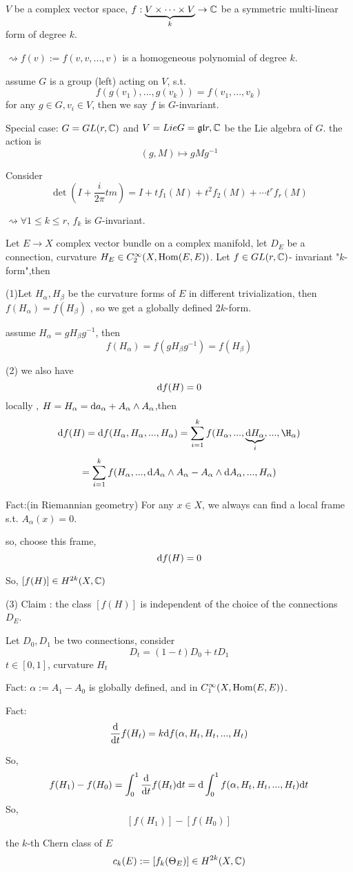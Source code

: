 $V$ be a complex vector space, $f:\underbrace{V\times\cdots\times V}_k\to \mathbb{C}$
be a symmetric multi-linear form of degree $k$. 

$\rightsquigarrow f(v):=f(v,v,...,v)$ is a homogeneous polynomial of degree $k$.
\begin{definition}
assume $G$ is a group (left) acting on $V$, s.t. 
$$f(g(v_1),...,g(v_k))=f(v_1,...,v_k)$$
for any $g\in G,v_i\in V$, then we say $f$ is $G$-invariant. 
\end{definition} 

Special case: $G=GL(r,\mathbb{C})$ and $V=Lie G=\mathfrak{gl}{r,\mathbb{C}}$ be the Lie algebra of $G$.
the action is 
$$(g,M)\mapsto gMg^{-1}$$

Consider 
$$\det(I+\frac{i}{2\pi}tm)=I+tf_1(M)+t^2f_2(M)+\cdots t^rf_r(M)$$

$\rightsquigarrow\forall 1\leq k\leq r$, $f_k$ is $G$-invariant.

Let $E\to X$ complex vector bundle on a complex manifold, 
let $D_E$ be a connection, 
curvature $H_E\in C_2^\infty(X,\operatorname{Hom}(E,E))$.
 Let $f\in GL(r,\mathbb{C})$- invariant "$k$-form",then

(1)Let $H_{\alpha},H_{\beta}$ be the curvature forms of $E$ in different trivialization, 
then $f(H_\alpha)=f(H_{\beta})$ , so we get a globally defined $2k$-form.

assume $H_\alpha=gH_\beta g^{-1}$, then 
$$f(H_\alpha)=f(g H_\beta g^{-1})=f(H_\beta)$$

(2) we also have 
$$\mathrm{d} f(H)=0$$
locally , $H=H_\alpha=\mathrm{d} a_\alpha+A_\alpha\wedge A_\alpha$,then 
$$\td f(H)=\td f(H_\alpha,H_\alpha,...,H_\alpha)
=\sum_{i=1}^kf(H_\alpha,...,\underbrace{\td H_\alpha}_{i},...,\H_\alpha)$$
$$
=\sum_{i=1}^kf(H_\alpha,...,\mathrm{d} A_\alpha\wedge A_\alpha-A_\alpha\wedge\mathrm{d} A_\alpha,...,H_\alpha)
$$ 

Fact:(in Riemannian geometry) For any $x\in X$, 
we always can find a local frame s.t. 
$A_\alpha(x)=0$.

so, choose this frame, 
$$\mathrm{d} f(H)=0$$

So, $[f(H)]\in H^{2k}(X,\mathbb{C})$

(3) Claim : the class $[f(H)]$ is independent of the choice of the connections $D_E$.

Let $D_0,D_1$ be two connections, consider 
$$D_t=(1-t)D_0+tD_1$$
$t\in[0,1]$, curvature $H_t$

Fact: $\alpha:=A_1-A_0$ is globally defined, and in $C_1^\infty(X,\operatorname{Hom}(E,E))$.

Fact: $$\frac{\mathrm{d}}{\mathrm{d} t}f(H_t)=k\mathrm{d} f(\alpha,H_t,H_t,...,H_t)$$

So, 
$$f(H_1)-f(H_0)=
\int_0^1\frac{\mathrm{d}}{\mathrm{d} t}f(H_t)\mathrm{d} t
=\mathrm{d}\int_0^1f(\alpha,H_t,H_t,...,H_t)\mathrm{d} t$$
So, 
$$[f(H_1)]-[f(H_0)]$$

\begin{definition}
the $k$-th Chern class of $E$ 
$$c_k(E):=[f_k(\Theta_E)]\in H^{2k}(X,\mathbb{C})$$
\end{definition}







